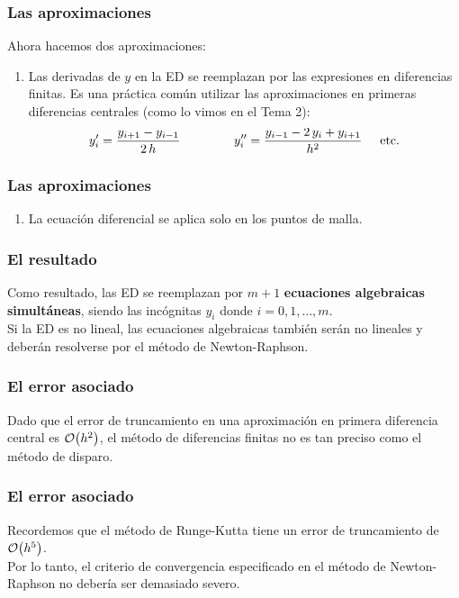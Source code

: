 \documentclass[12pt]{beamer}
\begin{document}
\begin{frame}
\frametitle{Las aproximaciones}
Ahora hacemos dos aproximaciones:
\pause
\\
\bigskip
\pause
{}
\begin{enumerate}
\item Las derivadas de $y$ en la ED se reemplazan por las expresiones en diferencias finitas. Es una práctica común utilizar las aproximaciones en primeras diferencias centrales (como lo vimos en el Tema 2):
\begin{align}
{y}^{\prime}_{i} = \dfrac{y_{i+1} - y_{i-1}}{2 \, h} \hspace{1.5cm} {y}^{\prime \prime}_{i} = \dfrac{y_{i-1} - 2 \, y_{i} +  y_{i+1}}{h^{2}} \hspace{0.5cm} \text{etc.}
\end{align}
\seti
\end{enumerate}
\end{frame}
\begin{frame}
\frametitle{Las aproximaciones}
\begin{enumerate}[<+->]
\item La ecuación diferencial se aplica solo en los puntos de malla.
\end{enumerate}
\end{frame}
\begin{frame}
\frametitle{El resultado}
Como resultado, las ED se reemplazan por $m + 1$ \textbf{\textcolor{chestnut}{ecuaciones algebraicas simultáneas}}, \pause siendo las incógnitas $y_{i}$ donde $i = 0, 1, \ldots, m$.
\\
\bigskip
Si la ED es no lineal, las ecuaciones algebraicas también serán no lineales y deberán resolverse por el método de Newton-Raphson.
\end{frame}
\begin{frame}
\frametitle{El error asociado}
Dado que el error de truncamiento en una aproximación en primera diferencia central es $\order{h^{2}}$, \pause el método de diferencias finitas no es tan preciso como el método de disparo.
\end{frame}
\begin{frame}
\frametitle{El error asociado}
Recordemos que el método de Runge-Kutta tiene un error de truncamiento de $\order{h^{5}}$.
\\
\bigskip
\pause
Por lo tanto, el criterio de convergencia especificado en el método de Newton-Raphson no debería ser demasiado severo.
\end{frame}
\end{document}
